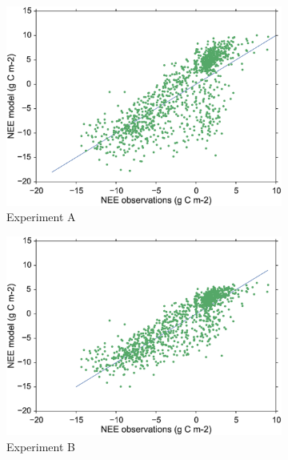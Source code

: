 \documentclass[11pt]{article}
\begin{document}
\begin{figure}
    \centering
    \begin{subfigure}[b]{0.49\textwidth}
        \includegraphics[width=\textwidth]{Afscat.eps}
        \caption{Experiment A}
        \label{fig:gull}
    \end{subfigure}
    \begin{subfigure}[b]{0.49\textwidth}
        \includegraphics[width=\textwidth]{Bfscat.eps}
        \caption{Experiment B}
        \label{fig:tiger}
    \end{subfigure}
    \begin{subfigure}[b]{0.49\textwidth}

\end{subfigure}
\end{figure}
\end{document}
